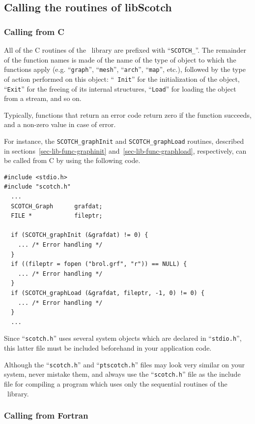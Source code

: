 \subsection{Calling the routines of {\sc libScotch}}

\subsubsection{Calling from C}

All of the C routines of the \libscotch\ library are prefixed with
``{\tt SCOTCH\_}''. The remainder of the function names is made of the
name of the type of object to which the functions apply (e\@.g\@.
``{\tt graph}'', ``{\tt mesh}'', ``{\tt arch}'', ``{\tt map}'', etc.),
followed by the type of action performed on this object: ``{\tt
Init}'' for the initialization of the object, ``{\tt Exit}'' for the
freeing of its internal structures, ``{\tt Load}'' for loading the
object from a stream, and so on.

Typically, functions that return an error code return zero if the
function succeeds, and a non-zero value in case of error.

For instance, the {\tt SCOTCH\_\lbt graph\lbt Init} and
{\tt SCOTCH\_\lbt graph\lbt Load} routines, described in
sections~\ref{sec-lib-func-graphinit}
and~\ref{sec-lib-func-graphload}, respectively, can
be called from C by using the following code.
\begin{lstlisting}[style=language-c]
#include <stdio.h>
#include "scotch.h"
  ...
  SCOTCH_Graph      grafdat;
  FILE *            fileptr;

  if (SCOTCH_graphInit (&grafdat) != 0) {
    ... /* Error handling */
  }
  if ((fileptr = fopen ("brol.grf", "r")) == NULL) {
    ... /* Error handling */
  }
  if (SCOTCH_graphLoad (&grafdat, fileptr, -1, 0) != 0) {
    ... /* Error handling */
  }
  ...
\end{lstlisting}

Since ``{\tt scotch.h}'' uses several system objects which are
declared in ``{\tt stdio.h}'', this latter file must be
included beforehand in your application code.

Although the ``{\tt scotch.h}'' and ``{\tt ptscotch.h}'' files may
look very similar on your system, never mistake them, and always use
the ``{\tt scotch.h}'' file as the include file for compiling a
program which uses only the sequential routines of the \libscotch\
library.

\subsubsection{Calling from Fortran}

